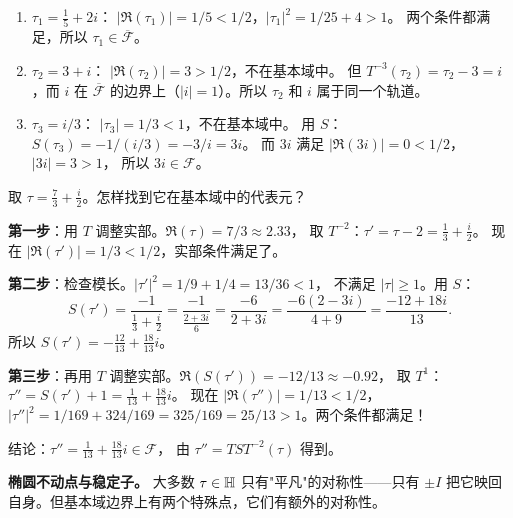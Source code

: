\begin{example}[判断一个点是否在基本域中]
\label{ex:point-in-F}
\leavevmode
\begin{enumerate}
  \item $\tau_1 = \frac{1}{5} + 2i$：
    $|\Re(\tau_1)| = 1/5 < 1/2$，$|\tau_1|^2 = 1/25 + 4 > 1$。
    两个条件都满足，所以 $\tau_1 \in \overline{\mathcal{F}}$。

  \item $\tau_2 = 3 + i$：
    $|\Re(\tau_2)| = 3 > 1/2$，不在基本域中。
    但 $T^{-3}(\tau_2) = \tau_2 - 3 = i$，而 $i$ 在 $\overline{\mathcal{F}}$
    的边界上（$|i| = 1$）。所以 $\tau_2$ 和 $i$ 属于同一个轨道。

  \item $\tau_3 = i/3$：
    $|\tau_3| = 1/3 < 1$，不在基本域中。
    用 $S$：$S(\tau_3) = -1/(i/3) = -3/i = 3i$。
    而 $3i$ 满足 $|\Re(3i)| = 0 < 1/2$，$|3i| = 3 > 1$，
    所以 $3i \in \mathcal{F}$。
\end{enumerate}
\end{example}

\begin{example}
\label{ex:reduce-to-F}
取 $\tau = \frac{7}{3} + \frac{i}{2}$。怎样找到它在基本域中的代表元？

\textbf{第一步}：用 $T$ 调整实部。$\Re(\tau) = 7/3 \approx 2.33$，
取 $T^{-2}$：$\tau' = \tau - 2 = \frac{1}{3} + \frac{i}{2}$。
现在 $|\Re(\tau')| = 1/3 < 1/2$，实部条件满足了。

\textbf{第二步}：检查模长。$|\tau'|^2 = 1/9 + 1/4 = 13/36 < 1$，
不满足 $|\tau| \geq 1$。用 $S$：
\[
  S(\tau') = \frac{-1}{\frac{1}{3} + \frac{i}{2}}
  = \frac{-1}{\frac{2 + 3i}{6}} = \frac{-6}{2 + 3i}
  = \frac{-6(2 - 3i)}{4 + 9} = \frac{-12 + 18i}{13}.
\]
所以 $S(\tau') = -\frac{12}{13} + \frac{18}{13}i$。

\textbf{第三步}：再用 $T$ 调整实部。$\Re(S(\tau')) = -12/13 \approx -0.92$，
取 $T^1$：$\tau'' = S(\tau') + 1 = \frac{1}{13} + \frac{18}{13}i$。
现在 $|\Re(\tau'')| = 1/13 < 1/2$，
$|\tau''|^2 = 1/169 + 324/169 = 325/169 = 25/13 > 1$。两个条件都满足！

结论：$\tau'' = \frac{1}{13} + \frac{18}{13}i \in \mathcal{F}$，
由 $\tau'' = TS T^{-2}(\tau)$ 得到。
\end{example}

\textbf{椭圆不动点与稳定子。}
\label{rem:elliptic-fixed-points}
大多数 $\tau \in \mathbb{H}$ 只有"平凡"的对称性——只有 $\pm I$
把它映回自身。但基本域边界上有两个特殊点，它们有额外的对称性。

